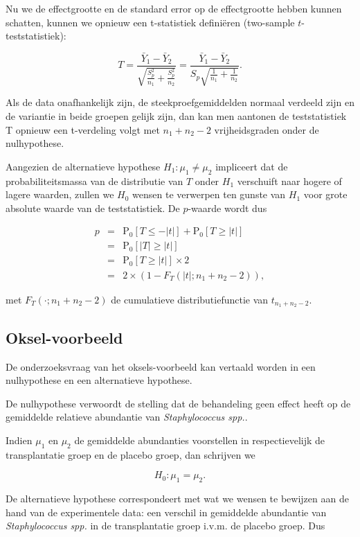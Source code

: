 \documentclass[
  12pt,dutch,coursenotes]{book}
\theoremstyle{definition}
\theoremstyle{definition}
\theoremstyle{definition}
\theoremstyle{remark}
\begin{document}
Nu we de effectgrootte en de standard error op de effectgrootte hebben kunnen schatten, kunnen we opnieuw een t-statistiek definiëren (two-sample \(t\)-teststatistiek):

\[T = \frac{\bar{Y}_1-\bar{Y}_2}{\sqrt{\frac{S_p^2}{n_1}+\frac{S_p^2}{n_2}}} =
  \frac{\bar{Y}_1 - \bar{Y}_2}{S_p\sqrt{\frac{1}{n_1}+\frac{1}{n_2}}}.\]

Als de data onafhankelijk zijn, de steekproefgemiddelden normaal verdeeld zijn en de variantie in beide groepen gelijk zijn, dan kan men aantonen de teststatistiek T opnieuw een t-verdeling volgt met \(n_1+n_2-2\) vrijheidsgraden onder de nulhypothese.

Aangezien de alternatieve hypothese \(H_1: \mu_1 \neq \mu_2\) impliceert dat de probabiliteitsmassa van de distributie van \(T\) onder \(H_1\) verschuift naar hogere of lagere waarden, zullen we \(H_0\) wensen te verwerpen ten gunste van \(H_1\) voor grote absolute waarde van de teststatistiek. De \(p\)-waarde wordt dus

\begin{eqnarray*}
  p&=&\text{P}_0\left[T\leq -|t|\right] + \text{P}_0\left[T\geq |t|\right]\\
  &=&\text{P}_0\left[\vert T\vert \geq \vert t \vert\right]\\
  &=&\text{P}_0\left[T \geq \vert t \vert\right]\times 2\\
  &=& 2\times(1-F_T(\vert t\vert;n_1+n_2-2)),
\end{eqnarray*}

met \(F_T(\cdot;n_1+n_2-2)\) de cumulatieve distributiefunctie van \(t_{n_1+n_2-2}\).

\hypertarget{oksel-voorbeeld}{%
\subsection{Oksel-voorbeeld}\label{oksel-voorbeeld}}

De onderzoeksvraag van het oksels-voorbeeld kan vertaald worden in een nulhypothese en een alternatieve hypothese.

De nulhypothese verwoordt de stelling dat de behandeling geen effect heeft op de gemiddelde relatieve abundantie van \emph{Staphylococcus spp.}.

Indien \(\mu_1\) en \(\mu_2\) de gemiddelde abundanties voorstellen in respectievelijk de transplantatie groep en de placebo groep, dan schrijven we

\[H_0: \mu_1=\mu_2.\]

De alternatieve hypothese correspondeert met wat we wensen te bewijzen aan de hand van de experimentele data: een verschil in gemiddelde abundantie van \emph{Staphylococcus spp.} in de transplantatie groep i.v.m. de placebo groep. Dus
\end{document}
